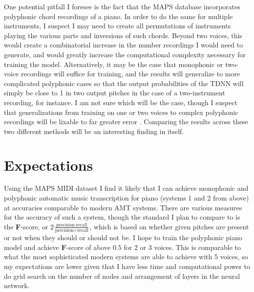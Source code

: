 \documentclass[conference]{IEEEtran}
\begin{document}
One potential pitfall I foresee is the fact that the MAPS database incorporates polyphonic chord recordings of a piano. In order to do the same for multiple instruments, I suspect I may need to create all permutations of instruments playing the various parts and inversions of such chords. Beyond two voices, this would create a combinatorial increase in the number recordings I would need to generate, and would greatly increase the computational complexity necessary for training the model. Alternatively, it may be the case that monophonic or two-voice recordings will suffice for training, and the results will generalize to more complicated polyphonic cases so that the output probabilities of the TDNN will simply be close to 1 in two output pitches in the case of a two-instrument recording, for instance. I am not sure which will be the case, though I suspect that generalizations from training on one or two voices to complex polyphonic recordings will be lixable to far greater error \cite{benetos}. Comparing the results across these two different methods will be an interesting finding in itself.

\section{Expectations}

Using the MAPS MIDI dataset I find it likely that I can achieve monophonic and polyphonic automatic music transcription for piano (systems 1 and 2 from above) at accuracies comparable to modern AMT systems. There are various measures for the accuracy of such a system, though the standard I plan to compare to is the \textbf{F}-score, or $2\frac{\text{precision} \cdot \text{recall}}{\text{precision} + \text{recall}}$, which is based on whether given pitches are present or not when they should or should not be. I hope to train the polyphonic piano model and achieve \textbf{F}-score of above 0.5 for 2 or 3 voices. This is comparable to what the most sophisticated modern systems are able to achieve \cite{sigtia} with 5 voices, so my expectations are lower given that I have less time and computational power to do grid search on the number of nodes and arrangement of layers in the neural network.
\end{document}
